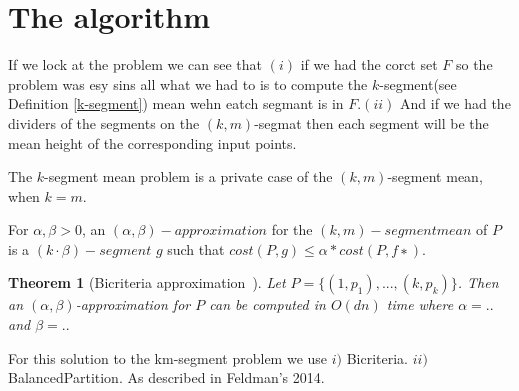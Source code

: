 \documentclass{vldb}
\begin{document}
\section{The algorithm}
If we lock at the problem we can see that $(i)$ if we had the corct set $F$
so the problem was esy sins all what we had to is to compute the $k$-segment(see Definition \ref{k-segment}) mean wehn eatch segmant is in $F$.$(ii)$ And if we had the dividers of the segments on the $(k,m)$-segmat then each segment
will be the mean height of the corresponding input points. 

\begin{definition} \label{k-segment}
The $k$-segment mean problem is a private case of the $(k,m)$-segment mean, when $k = m$.

\end{definition}


\begin{definition}
For $ \alpha, \beta > 0$, an $(\alpha, \beta)-approximation$ for the $(k,m)-segment mean$
 of $P$ is a $(k · β)-segment$ $ g$ such that $cost(P, g) \leq \alpha \ast cost(P, f ∗).$

\end{definition}

\newtheorem{theorem}{Theorem}
\begin{theorem}[Bicriteria approximation~\cite{FL11}]
Let $P=\lbrace(1, p_1),...,(k, p_k)\rbrace$. Then an $(\alpha,\beta)$-approximation for $P$ can be computed in $O(dn)$ time where $\alpha=..$ and $\beta=..$

\end{theorem}

For this solution to the km-segment problem we use 
$i)$ Bicriteria.
$ii)$ BalancedPartition.
As described in Feldman's 2014.
\end{document}

